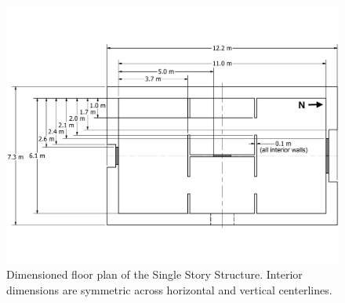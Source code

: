\documentclass[12pt,oneside]{book}
\begin{document}
\begin{figure}[!ht]
	\includegraphics[width=\columnwidth]{../Figures/Floor_Plans/East_Test_Structure_Dimensioned_Full}
	\caption[Dimensioned floor plan of the Single Story Structure.]{Dimensioned floor plan of the Single Story Structure. Interior dimensions are symmetric across horizontal and vertical centerlines.}
	\label{fig:east_dimensioned_plan}
\end{figure}

\clearpage
\end{document}
